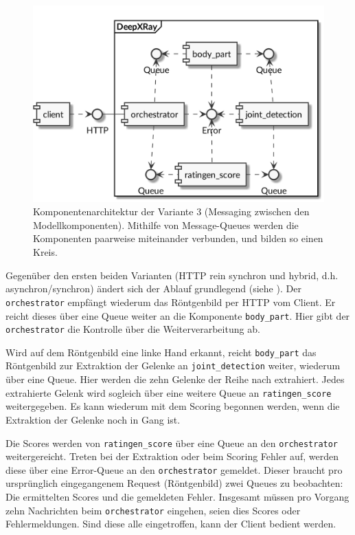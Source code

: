 \begin{figure}[tbh]
    \centering
    \includegraphics[width=\linewidth]{pics/architektur-variante-queue-1.png}
    \caption{Komponentenarchitektur der Variante 3 (Messaging zwischen den Modellkomponenten). Mithilfe von Message-Queues werden die Komponenten paarweise miteinander verbunden, und bilden so einen Kreis.}
    \label{fig:architektur-variante-queue-1}
\end{figure}

Gegenüber den ersten beiden Varianten (HTTP rein synchron und hybrid, d.h. asynchron/synchron) ändert sich der Ablauf grundlegend (siehe ). Der \texttt{orchestrator} empfängt wiederum das Röntgenbild per HTTP vom Client. Er reicht dieses über eine Queue weiter an die Komponente \texttt{body\_part}. Hier gibt der \texttt{orchestrator} die Kontrolle über die Weiterverarbeitung ab.

Wird auf dem Röntgenbild eine linke Hand erkannt, reicht \texttt{body\_part} das Röntgenbild zur Extraktion der Gelenke an \texttt{joint\_detection} weiter, wiederum über eine Queue. Hier werden die zehn Gelenke der Reihe nach extrahiert. Jedes extrahierte Gelenk wird sogleich über eine weitere Queue an \texttt{ratingen\_score} weitergegeben. Es kann wiederum mit dem Scoring begonnen werden, wenn die Extraktion der Gelenke noch in Gang ist.

Die Scores werden von \texttt{ratingen\_score} über eine Queue an den \texttt{orchestrator} weitergereicht. Treten bei der Extraktion oder beim Scoring Fehler auf, werden diese über eine Error-Queue an den \texttt{orchestrator} gemeldet. Dieser braucht pro ursprünglich eingegangenem Request (Röntgenbild) zwei Queues zu beobachten: Die ermittelten Scores und die gemeldeten Fehler. Insgesamt müssen pro Vorgang zehn Nachrichten beim \texttt{orchestrator} eingehen, seien dies Scores oder Fehlermeldungen. Sind diese alle eingetroffen, kann der Client bedient werden.


